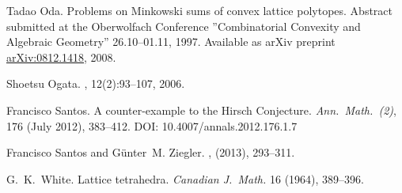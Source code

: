 \documentclass{amsart}
\theoremstyle{plain}
\theoremstyle{definition}
\begin{document}
\begin{thebibliography}{99}
Tadao Oda. Problems on Minkowski sums of convex lattice polytopes. 
Abstract submitted at the Oberwolfach Conference ''Combinatorial Convexity and Algebraic Geometry'' 26.10--01.11, 1997.
Available as arXiv preprint \href{https://arxiv.org/abs/0812.1418}{arXiv:0812.1418}, 2008.

Shoetsu Ogata.
, 12(2):93--107, 2006.

Francisco Santos.
A counter-example to the Hirsch Conjecture.
\emph{Ann.~Math.~(2)}, 176 (July 2012), 383--412. 
DOI: 10.4007/annals.2012.176.1.7

Francisco Santos and G{\"u}nter~M. Ziegler.
, 
 (2013), 293--311. %

G.~K.~White.
Lattice tetrahedra.
\emph{Canadian J.~Math.} 16 (1964), 389--396.

\end{thebibliography}
\end{document}

